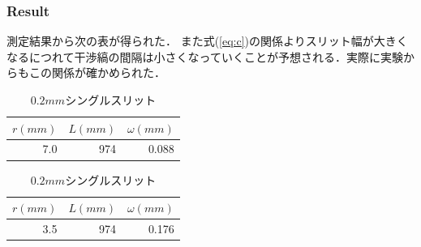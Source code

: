 \documentclass[11pt, a4paper]{jsarticle}
\begin{document}
\subsubsection{Result}
測定結果から次の表が得られた．
また式(\ref{eq:c})の関係よりスリット幅が大きくなるにつれて干渉縞の間隔は小さくなっていくことが予想される．実際に実験からもこの関係が確かめられた．
\begin{table}[htb]
 \begin{minipage}{0.45\hsize}
  \begin{center}
    \caption{$0.1mm$シングルスリット}
    \begin{tabular}{rrr} \hline
        $r(mm)$ & $L(mm)$ & $\omega(mm)$  \\ \hline
        7.0    & 974 & 0.088\\ \hline
    \end{tabular}
    \label{tab:d}
  \end{center}
 \end{minipage}
 \begin{minipage}{0.45\hsize}
  \begin{center}
    \caption{$0.2mm$シングルスリット}
    \begin{tabular}{rrr} \hline
        $r(mm)$ & $L(mm)$ & $\omega(mm)$  \\ \hline
        3.5    & 974 & 0.176\\ \hline
    \end{tabular}
    \label{tab:e}
  \end{center}
 \end{minipage}
\end{table}
\end{document}
